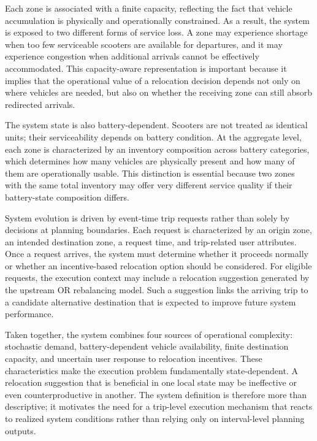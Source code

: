Each zone is associated with a finite capacity, reflecting the fact that vehicle accumulation is physically and operationally constrained. As a result, the system is exposed to two different forms of service loss. A zone may experience shortage when too few serviceable scooters are available for departures, and it may experience congestion when additional arrivals cannot be effectively accommodated. This capacity-aware representation is important because it implies that the operational value of a relocation decision depends not only on where vehicles are needed, but also on whether the receiving zone can still absorb redirected arrivals.

The system state is also battery-dependent. Scooters are not treated as identical units; their serviceability depends on battery condition. At the aggregate level, each zone is characterized by an inventory composition across battery categories, which determines how many vehicles are physically present and how many of them are operationally usable. This distinction is essential because two zones with the same total inventory may offer very different service quality if their battery-state composition differs.

System evolution is driven by event-time trip requests rather than solely by decisions at planning boundaries. Each request is characterized by an origin zone, an intended destination zone, a request time, and trip-related user attributes. Once a request arrives, the system must determine whether it proceeds normally or whether an incentive-based relocation option should be considered. For eligible requests, the execution context may include a relocation suggestion generated by the upstream OR rebalancing model. Such a suggestion links the arriving trip to a candidate alternative destination that is expected to improve future system performance.

Taken together, the system combines four sources of operational complexity: stochastic demand, battery-dependent vehicle availability, finite destination capacity, and uncertain user response to relocation incentives. These characteristics make the execution problem fundamentally state-dependent. A relocation suggestion that is beneficial in one local state may be ineffective or even counterproductive in another. The system definition is therefore more than descriptive; it motivates the need for a trip-level execution mechanism that reacts to realized system conditions rather than relying only on interval-level planning outputs.



